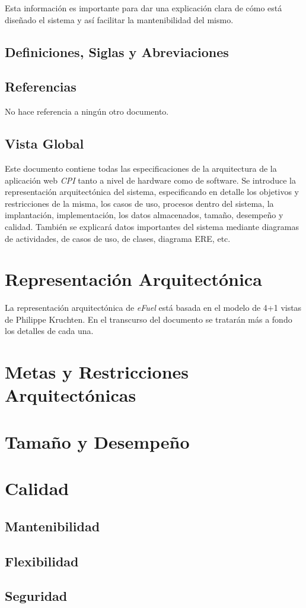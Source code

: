 \documentclass{article}
\begin{document}
    Esta información es importante para dar una explicación clara de cómo está diseñado el sistema y así facilitar la mantenibilidad del mismo.

    \subsection{Definiciones, Siglas y Abreviaciones}

    \subsection{Referencias}
    No hace referencia a ningún otro documento.

    \subsection{Vista Global}
    Este documento contiene todas las especificaciones de la arquitectura de la aplicación web \emph{CPI} tanto a nivel de hardware como de software. Se introduce la representación arquitectónica del sistema, especificando en detalle los objetivos y restricciones de la misma, los casos de uso, procesos dentro del sistema, la implantación, implementación, los datos almacenados, tamaño, desempeño y calidad. También se explicará datos importantes del sistema mediante diagramas de actividades, de casos de uso, de clases, diagrama ERE, etc.
    

    \section{Representación Arquitectónica} \label{reprArq}
    La representación arquitectónica de \emph{eFuel} está basada en el modelo de 4+1 vistas de Philippe Kruchten. En el transcurso del documento se tratarán más a fondo los detalles de cada una.

    \section{Metas y Restricciones Arquitectónicas} \label{metasArq}

    
    
    
    
    

    \section{Tamaño y Desempeño} \label{tamDesemp}

    \section{Calidad}
    \subsection{Mantenibilidad}
    \subsection{Flexibilidad}
    \subsection{Seguridad}
\end{document}
